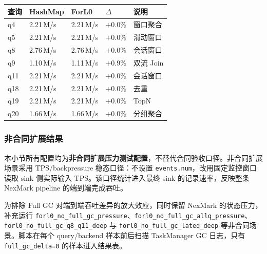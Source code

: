 \documentclass[a4paper,11pt]{article}
\begin{document}
\begin{table}[H]
\centering
\small
\begin{tabularx}{\textwidth}{L{1.2cm} R{2.2cm} R{2.2cm} R{1.5cm} X}
\toprule
\textbf{查询} & \textbf{HashMap} & \textbf{ForL0} & $\Delta$ & \textbf{说明} \\
\midrule
q4  & 2.21\,M/s & 2.21\,M/s & $+$0.0\% & 窗口聚合 \\
q5  & 2.21\,M/s & 2.21\,M/s & $+$0.0\% & 滑动窗口 \\
q8  & 2.76\,M/s & 2.76\,M/s & $+$0.0\% & 会话窗口 \\
q9  & 1.10\,M/s & 1.11\,M/s & $+$0.9\% & 双流 Join \\
q11 & 2.21\,M/s & 2.21\,M/s & $+$0.0\% & 会话窗口 \\
q18 & 2.21\,M/s & 2.21\,M/s & $+$0.0\% & 去重 \\
q19 & 2.21\,M/s & 2.21\,M/s & $+$0.0\% & TopN \\
q20 & 1.66\,M/s & 1.66\,M/s & $+$0.0\% & 分组聚合 \\
\bottomrule
\end{tabularx}
\end{table}

\subsubsection{非合同扩展结果}

本小节所有配置均为\textbf{非合同扩展压力测试配置}，不替代合同验收口径。非合同扩展场景采用 TPS/backpressure 稳态口径：不设置 \texttt{events.num}，改用固定监控窗口读取 sink 侧实际输入 TPS。该口径统计进入最终 sink 的记录速率，反映整条 NexMark pipeline 的端到端完成吞吐。

为排除 Full GC 对端到端吞吐差异的放大效应，同时保留 NexMark 的状态压力，补充运行 \texttt{forl0\_no\_full\_gc\_pressure}、\texttt{forl0\_no\_full\_gc\_allq\_pressure}、\texttt{forl0\_no\_full\_gc\_q8\_q11\_deep} 与 \texttt{forl0\_no\_full\_gc\_lateq\_deep} 等非合同场景。脚本在每个 query/backend 样本前后扫描 TaskManager GC 日志，只有 \texttt{full\_gc\_delta=0} 的样本进入结果表。
\end{document}
